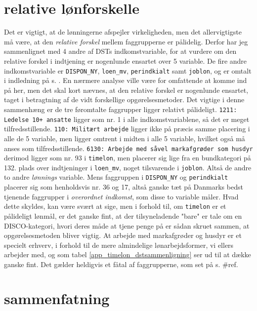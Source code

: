 \section{relative lønforskelle \label{app_relativloen}}


Det er vigtigt, at de lønningerne afspejler virkeligheden, men det allervigtigste må være, at den \emph{relative forskel} mellem faggrupperne er pålidelig. Derfor har jeg sammenlignet med 4 andre af DSTs indkomstvariable, for at vurdere om den relative forskel i indtjening er nogenlunde ensartet over 5 variable. De fire andre indkomstvariable 
er \texttt{DISPON\_NY}, \texttt{loen\_mv}, \texttt{perindkialt} samt \texttt{joblon}, og er omtalt i indledning på s. . En nærmere analyse ville være for omfattende at komme ind på her, men det skal kort nævnes, at den relative forskel er nogenlunde ensartet, taget i betragtning af de vidt forskellige opgørelsesmetoder. Det vigtige i denne sammenhæng er de tre føromtalte faggrupper ligger relativt pålideligt. \texttt{1211: Ledelse 10+ ansatte} ligger som nr. 1 i alle indkomstvariablene, så det er meget tilfredsstillende. \texttt{110: Militært arbejde} ligger ikke på præcis samme placering i alle de 5 variable, men ligger omtrent i midten i alle 5 variable, hvilket også må anses som tilfredsstillende. \texttt{6130: Arbejde med såvel markafgrøder som husdyr} derimod ligger som nr. 93 i \texttt{timelon}, men placerer sig lige fra en bundkategori på 132. plads over indtjeninger i \texttt{loen\_mv}, noget tilsvarende i \texttt{joblon}. Altså de andre to andre \emph{lønnings} variable. Mens faggruppen i \texttt{DISPON\_NY} og \texttt{perindkialt} placerer sig som henholdsvis nr. 36 og 17, altså ganske tæt på Danmarks bedst tjenende faggrupper i \emph{overordnet indkomst}, som disse to variable måler. Hvad dette skyldes, kan være svært at sige, men i forhold til, om \texttt{timelon} er et pålideligt lønmål, er det ganske fint, at der tilsyneladende "bare" er tale om en DISCO-kategori, hvori deres måde at tjene penge på er sådan skruet sammen, at opgørelsesmetoden bliver vigtig. At arbejde med markafgrøder og husdyr er et specielt erhverv, i forhold til de mere almindelige lønarbejdsformer, vi ellers arbejder med, og som tabel \ref{app_timelon_dstsammenligning} ser ud til at dække ganske fint. Det gælder heldigvis et fåtal af faggrupperne, som set på s. \#ref. 

\section{sammenfatning \label{app_indksammenfatning}}

